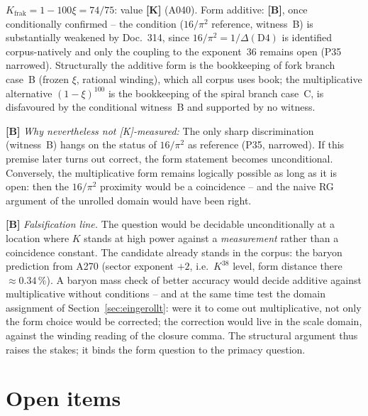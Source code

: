 \begin{keyresult}
$K_\text{frak} = 1-100\xi = 74/75$: value \textbf{[K]} (A040). Form
additive: \textbf{[B]}, once conditionally confirmed -- the
condition ($16/\pi^2$ reference, witness~B) is substantially weakened by Doc.~314, since
$16/\pi^2 = 1/\Delta(\mathrm{D4})$ is identified corpus-natively and
only the coupling to the exponent~$36$ remains open (P35 narrowed).
Structurally the additive form is the bookkeeping of fork branch
case~B (frozen $\xi$, rational winding), which all corpus uses book;
the multiplicative alternative $(1-\xi)^{100}$ is the bookkeeping of
the spiral branch case~C, is disfavoured by the conditional
witness~B and supported by no witness.
\end{keyresult}


\textbf{[B]} \emph{Why nevertheless not [K]-measured:} The only sharp
discrimination (witness~B) hangs on the status of $16/\pi^2$ as
reference (P35, narrowed). If this premise later turns out correct,
the form statement becomes unconditional. Conversely, the
multiplicative form remains logically possible as long as it is open:
then the $16/\pi^2$ proximity would be a coincidence -- and the naive
RG argument of the unrolled domain would have been right.

\textbf{[B]} \emph{Falsification line.} The question would be
decidable unconditionally at a location where $K$ stands at high
power against a \emph{measurement} rather than a coincidence
constant. The candidate already stands in the corpus: the baryon
prediction from A270 (sector exponent $+2$, i.e.\ $K^{38}$ level,
form distance there $\approx0.34\,\%$). A baryon mass check of better
accuracy would decide additive against multiplicative without
conditions -- and at the same time test the domain assignment of
Section~\ref{sec:eingerollt}: were it to come out multiplicative, not
only the form choice would be corrected; the correction would live in
the scale domain, against the winding reading of the closure comma.
The structural argument thus raises the stakes; it binds the form
question to the primacy question.

\section{Open items}

